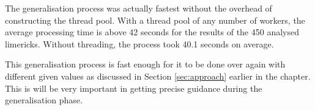 The generalisation process was actually fastest without the overhead of constructing the thread pool. With a thread pool of any number of workers, the average processing time is above 42 seconds for the results of the 450 analysed limericks. Without threading, the process took 40.1 seconds on average.

This generalisation process is fast enough for it to be done over again with different given values as discussed in Section \ref{sec:approach} earlier in the chapter. This is will be very important in getting precise guidance during the generalisation phase. 



